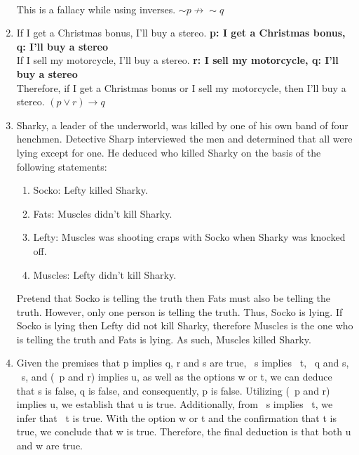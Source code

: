 \documentclass{article}
\makeatletter
\newcommand\setItemnumber[1]{\setcounter{enum\romannumeral\@enumdepth}{\numexpr#1-1\relax}}
\makeatother
\begin{document}
\begin{enumerate}
    \\
    This is a fallacy while using inverses. $\sim p \not\rightarrow \sim q$
    \setItemnumber{32}
    \item If I get a Christmas bonus, I’ll buy a stereo. \textbf{p: I get a Christmas bonus, q: I'll buy a stereo} \\
    If I sell my motorcycle, I’ll buy a stereo. \textbf{r: I sell my motorcycle, q: I'll buy a stereo}\\
    Therefore, if I get a Christmas bonus or I sell my motorcycle, then I’ll buy a stereo. \textbf{$(p\lor r) \rightarrow q$}\\
    \setItemnumber{40}
    \item  Sharky, a leader of the underworld, was killed by one of his own band of four henchmen. Detective Sharp interviewed the men and determined that all were lying except for one. He deduced who killed Sharky on the basis of the following statements:
    \begin{enumerate}
        \item Socko: Lefty killed Sharky.
        \item Fats: Muscles didn’t kill Sharky.
        \item Lefty: Muscles was shooting craps with Socko when Sharky was knocked off.
        \item Muscles: Lefty didn’t kill Sharky.
    \end{enumerate}
    Pretend that Socko is telling the truth then Fats must also be telling the truth. However, only one person is telling the truth. Thus, Socko is lying. If Socko is lying then Lefty did not kill Sharky, therefore Muscles is the one who is telling the truth and Fats is lying. As such, Muscles killed Sharky.
    \setItemnumber{44}
    \item Given the premises that p implies q, r and s are true, ~s implies ~t, ~q and s, ~s, and (~p and r) implies u, as well as the options w or t, we can deduce that s is false, q is false, and consequently, p is false. Utilizing (~p and r) implies u, we establish that u is true. Additionally, from ~s implies ~t, we infer that ~t is true. With the option w or t and the confirmation that t is true, we conclude that w is true. Therefore, the final deduction is that both u and w are true.
\end{enumerate}
\newpage
\end{document}
